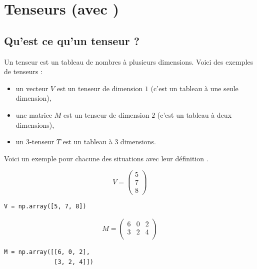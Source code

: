 \documentclass[11pt,class=report,crop=false]{standalone}
\begin{document}





\section{Tenseurs (avec \numpy)}


\subsection{Qu'est ce qu'un tenseur ?}

Un tenseur est un tableau de nombres à plusieurs dimensions.
Voici des exemples de tenseurs :
\begin{itemize}
  \item un vecteur $V$ est un tenseur de dimension $1$ (c'est un tableau à une seule dimension),
  \item une matrice $M$ est un tenseur de dimension $2$ (c'est un tableau à deux dimensions),
  \item un $3$-tenseur $T$ est un tableau à $3$ dimensions.
\end{itemize}

Voici un exemple pour chacune des situations avec leur définition \numpy.

\begin{minipage}{0.4\textwidth}
$$V = \begin{pmatrix}5\\7\\8\end{pmatrix}$$
\end{minipage}
\begin{minipage}{0.4\textwidth}
\begin{lstlisting}
V = np.array([5, 7, 8]) 
\end{lstlisting}
\end{minipage}

\medskip

\begin{minipage}{0.4\textwidth}
$$M = \begin{pmatrix}
6 & 0 & 2 \\ 
3 & 2 & 4 \\
\end{pmatrix}$$
\end{minipage}
\begin{minipage}{0.4\textwidth}
\begin{lstlisting}
M = np.array([[6, 0, 2], 
	          [3, 2, 4]])
\end{lstlisting}
\end{minipage}
\end{document}
